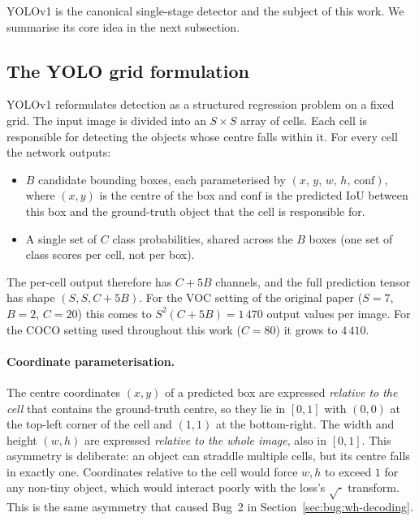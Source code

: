 \noindent YOLOv1 is the canonical single-stage detector and the subject of
this work. We summarise its core idea in the next subsection.

\subsection{The YOLO grid formulation}
\label{sec:theory:grid}

YOLOv1 reformulates detection as a structured regression problem on a fixed
grid. The input image is divided into an $S \times S$ array of cells. Each
cell is responsible for detecting the objects whose centre falls within it.
For every cell the network outputs:
\begin{itemize}
    \item $B$ candidate bounding boxes, each parameterised by
        $(x,\,y,\,w,\,h,\,\text{conf})$, where $(x,y)$ is the centre of the
        box and $\text{conf}$ is the predicted IoU between this box and the
        ground-truth object that the cell is responsible for.
    \item A single set of $C$ class probabilities, shared across the $B$
        boxes (one set of class scores per cell, not per box).
\end{itemize}

\noindent The per-cell output therefore has $C + 5B$ channels, and the full
prediction tensor has shape $(S, S, C + 5B)$. For the VOC setting of the
original paper ($S = 7$, $B = 2$, $C = 20$) this comes to $S^2(C+5B) = 1\,470$
output values per image. For the COCO setting used throughout this work
($C = 80$) it grows to $4\,410$.

\paragraph{Coordinate parameterisation.} The centre coordinates $(x, y)$ of a
predicted box are expressed \emph{relative to the cell} that contains the
ground-truth centre, so they lie in $[0, 1]$ with $(0, 0)$ at the top-left
corner of the cell and $(1, 1)$ at the bottom-right. The width and height
$(w, h)$ are expressed \emph{relative to the whole image}, also in $[0, 1]$.
This asymmetry is deliberate: an object can straddle multiple cells, but its
centre falls in exactly one. Coordinates relative to the cell would force
$w, h$ to exceed $1$ for any non-tiny object, which would interact poorly
with the loss's $\sqrt{\cdot}$ transform. This is the same asymmetry that
caused Bug~2 in Section~\ref{sec:bug:wh-decoding}.

